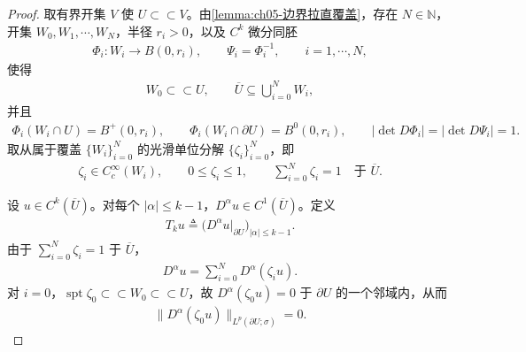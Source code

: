 \begin{proof}
取有界开集 $V$ 使 $U\subset\subset V$。由\cref{lemma:ch05-边界拉直覆盖}，存在 $N\in\mathbb{N}$，开集 $W_{0},W_{1},\cdots,W_{N}$，半径 $r_{i}>0$，以及 $C^{k}$ 微分同胚
\begin{align*}
\Phi_{i}:W_{i}\longrightarrow B(0,r_{i}),
\qquad
\Psi_{i}=\Phi_{i}^{-1},
\qquad i=1,\cdots,N,
\end{align*}
使得
\begin{align*}
W_{0}\subset\subset U,
\qquad
\overline{U}\subseteq\bigcup_{i=0}^{N}W_{i},
\end{align*}
并且
\begin{align*}
\Phi_{i}(W_{i}\cap U)=B^{+}(0,r_{i}),
\qquad
\Phi_{i}(W_{i}\cap\partial U)=B^{0}(0,r_{i}),
\qquad
|\det D\Phi_{i}|=|\det D\Psi_{i}|=1.
\end{align*}
取从属于覆盖 $\{W_{i}\}_{i=0}^{N}$ 的光滑单位分解 $\{\zeta_{i}\}_{i=0}^{N}$，即
\begin{align*}
\zeta_{i}\in C^{\infty}_{c}(W_{i}),
\qquad
0\leqslant\zeta_{i}\leqslant1,
\qquad
\sum_{i=0}^{N}\zeta_{i}=1\quad\text{于 }\overline{U}.
\end{align*}

设 $u\in C^{k}(\overline{U})$。对每个 $|\alpha|\leqslant k-1$，$D^{\alpha}u\in C^{1}(\overline{U})$。定义
\begin{align}
T_{k}u\triangleq\bigl(D^{\alpha}u|_{\partial U}\bigr)_{|\alpha|\leqslant k-1}.
\label{eq:ch05-证明-Ck定义}
\end{align}
由于 $\sum_{i=0}^{N}\zeta_{i}=1$ 于 $\overline{U}$，
\begin{align*}
D^{\alpha}u=\sum_{i=0}^{N}D^{\alpha}(\zeta_{i}u).
\end{align*}
对 $i=0$，$\operatorname{spt}\zeta_{0}\subset\subset W_{0}\subset\subset U$，故 $D^{\alpha}(\zeta_{0}u)=0$ 于 $\partial U$ 的一个邻域内，从而
\begin{align*}
\|D^{\alpha}(\zeta_{0}u)\|_{L^{p}(\partial U;\sigma)}=0.
\end{align*}


\end{proof}
